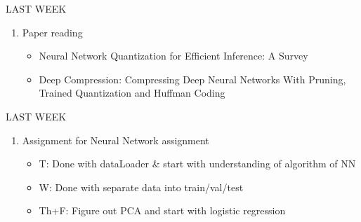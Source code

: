 \begin{frame}{LAST WEEK}
    \begin{enumerate}
        \item Paper reading
        \begin{itemize}
            \item Neural Network Quantization for Efficient Inference: A Survey
            \item Deep Compression: Compressing Deep Neural Networks With Pruning, Trained Quantization and Huffman Coding
        \end{itemize}
    \end{enumerate}
\end{frame}

\begin{frame}{LAST WEEK}
    \begin{enumerate}
        \item Assignment for Neural Network assignment
        \begin{itemize}
            \item T: Done with dataLoader \& start with understanding of algorithm of NN
            \item W: Done with separate data into train/val/test
            \item Th+F: Figure out PCA and start with logistic regression
        \end{itemize}
    \end{enumerate}
\end{frame}

